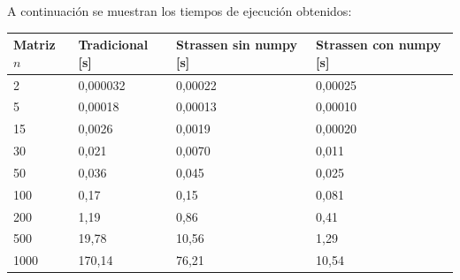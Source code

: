 \documentclass[a4paper,11pt]{article}
\begin{document}
A continuación se muestran los tiempos de ejecución obtenidos:
\begin{table}[h]
\centering
\begin{tabular}{|l|l|l|l|}
\hline
\textbf{Matriz $n$} & \textbf{Tradicional [s]} & \textbf{Strassen sin numpy [s]} & \textbf{Strassen con numpy [s]} \\ \hline
2                         & 0,000032             & 0,00022      & 0,00025           \\ \hline
5                         & 0,00018              & 0,00013      & 0,00010           \\ \hline
15                        & 0,0026               & 0,0019       & 0,00020           \\ \hline
30                        & 0,021                & 0,0070       & 0,011             \\ \hline
50                        & 0,036                & 0,045        & 0,025             \\ \hline
100                       & 0,17                 & 0,15         & 0,081             \\ \hline
200                       & 1,19                 & 0,86         & 0,41              \\ \hline
500                       & 19,78                & 10,56        & 1,29              \\ \hline
1000                      & 170,14               & 76,21        & 10,54             \\ \hline
\end{tabular}
\end{table}\\
\end{document}
